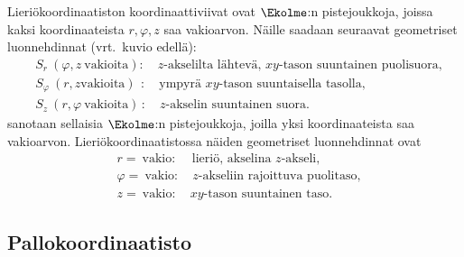 Lieriökoordinaatiston koordinaattiviivat ovat $\Ekolme$:n pistejoukkoja, joissa kaksi 
koordinaateista $r,\varphi,z$ saa vakioarvon. Näille saadaan seuraavat geometriset luonnehdinnat
(vrt.\ kuvio edellä):
\begin{align*}
&S_r\       (\varphi,z\ \text{vakioita}): \quad \text{$z$-akselilta lähtevä, 
                                                      $xy$-tason suuntainen puolisuora}, \\
&S_\varphi\ (r,z \text{vakioita})\,\ :  \quad \text{ympyrä $xy$-tason suuntaisella tasolla}, \\
&S_z\       (r,\varphi\ \text{vakioita})\, : \quad \text{$z$-akselin suuntainen suora}.
\end{align*}
%
 sanotaan sellaisia $\Ekolme$:n pistejoukkoja, joilla yksi
koordinaateista saa vakioarvon. Lieriökoordinaatistossa näiden geometriset luonnehdinnat ovat
\begin{align*}
&r=\ \text{vakio}:       \quad\, \text{lieriö, akselina $z$-akseli}, \\
&\varphi=\ \text{vakio}: \quad   \text{$z$-akseliin rajoittuva puolitaso}, \\
&z=\ \text{vakio}:       \quad   \text{$xy$-tason suuntainen taso}.
\end{align*}

\subsection*{Pallokoordinaatisto}

